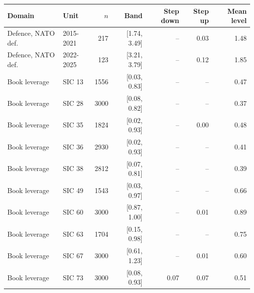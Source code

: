 \begin{tabular}{llrrrrr}\toprule
Domain & Unit & $n$ & Band & Step down & Step up & Mean level\\\midrule
Defence, NATO def. & 2015-2021 & 217 & [1.74, 3.49] & -- & 0.03 & 1.48\\
Defence, NATO def. & 2022-2025 & 123 & [3.21, 3.79] & -- & 0.12 & 1.85\\
Book leverage & SIC 13 & 1556 & [0.03, 0.83] & -- & -- & 0.47\\
Book leverage & SIC 28 & 3000 & [0.08, 0.82] & -- & -- & 0.37\\
Book leverage & SIC 35 & 1824 & [0.02, 0.93] & -- & 0.00 & 0.48\\
Book leverage & SIC 36 & 2930 & [0.02, 0.93] & -- & -- & 0.41\\
Book leverage & SIC 38 & 2812 & [0.07, 0.81] & -- & -- & 0.39\\
Book leverage & SIC 49 & 1543 & [0.03, 0.97] & -- & -- & 0.66\\
Book leverage & SIC 60 & 3000 & [0.87, 1.00] & -- & 0.01 & 0.89\\
Book leverage & SIC 63 & 1704 & [0.15, 0.98] & -- & -- & 0.75\\
Book leverage & SIC 67 & 3000 & [0.61, 1.23] & -- & 0.01 & 0.60\\
Book leverage & SIC 73 & 3000 & [0.08, 0.93] & 0.07 & 0.07 & 0.51\\
\bottomrule\end{tabular}